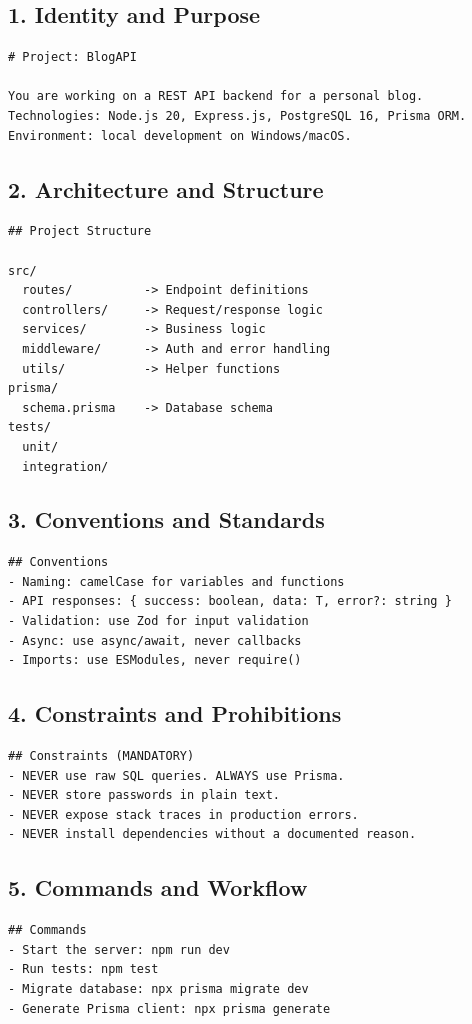 \subsection{1. Identity and Purpose}
\begin{lstlisting}[language={}]
# Project: BlogAPI

You are working on a REST API backend for a personal blog.
Technologies: Node.js 20, Express.js, PostgreSQL 16, Prisma ORM.
Environment: local development on Windows/macOS.
\end{lstlisting}

\subsection{2. Architecture and Structure}
\begin{lstlisting}[language={}]
## Project Structure

src/
  routes/          -> Endpoint definitions
  controllers/     -> Request/response logic
  services/        -> Business logic
  middleware/      -> Auth and error handling
  utils/           -> Helper functions
prisma/
  schema.prisma    -> Database schema
tests/
  unit/
  integration/
\end{lstlisting}

\subsection{3. Conventions and Standards}
\begin{lstlisting}[language={}]
## Conventions
- Naming: camelCase for variables and functions
- API responses: { success: boolean, data: T, error?: string }
- Validation: use Zod for input validation
- Async: use async/await, never callbacks
- Imports: use ESModules, never require()
\end{lstlisting}

\subsection{4. Constraints and Prohibitions}
\begin{lstlisting}[language={}]
## Constraints (MANDATORY)
- NEVER use raw SQL queries. ALWAYS use Prisma.
- NEVER store passwords in plain text.
- NEVER expose stack traces in production errors.
- NEVER install dependencies without a documented reason.
\end{lstlisting}

\subsection{5. Commands and Workflow}
\begin{lstlisting}[language={}]
## Commands
- Start the server: npm run dev
- Run tests: npm test
- Migrate database: npx prisma migrate dev
- Generate Prisma client: npx prisma generate
\end{lstlisting}

